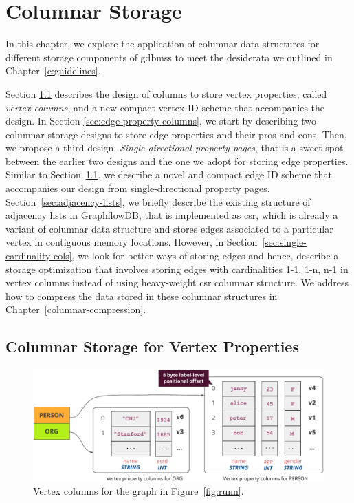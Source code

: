 \chapter{Columnar Storage}
\label{c:columnar-storage}

In this chapter, we explore the application of columnar data structures for different storage components of  \gls{gdbms}s to meet the desiderata we outlined in Chapter~\ref{c:guidelines}. 

Section \ref{sec:vertex-property-columns} describes the design of columns to store vertex properties, called \emph{vertex columns}, and a new compact vertex ID scheme that accompanies the design. In Section \ref{sec:edge-property-columns}, we start by describing two columnar storage designs to store edge properties and their pros and cons. Then, we propose a third design, \emph{Single-directional property pages}, that is a sweet spot between the earlier two designs and the one we adopt for storing edge properties. Similar to Section~\ref{sec:vertex-property-columns}, we describe a novel and compact edge ID scheme that accompanies our design from single-directional property pages. Section~\ref{sec:adjacency-lists}, we briefly describe the existing structure of adjacency lists in GraphflowDB, that is implemented as \gls{csr}, which is already a variant of columnar data structure and stores edges associated to a particular vertex in contiguous memory locations. However, in Section~\ref{sec:single-cardinality-cols}, we look for better ways of storing edges and hence, describe a storage optimization that involves storing edges with cardinalities 1-1, 1-n, n-1 in vertex columns instead of using heavy-weight \gls{csr} columnar structure. We address how to compress the data stored in these columnar structures in Chapter~\ref{columnar-compression}.

\section{Columnar Storage for Vertex Properties}
\label{sec:vertex-property-columns}

\begin{figure}
	\hfill\includegraphics[scale=0.85]{img/vpcols}\hspace*{\fill}
	\caption{Vertex columns for the graph in Figure~\ref{fig:runn}.}
	\label{fig:vpcols}
\end{figure}

